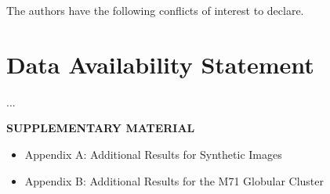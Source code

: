 \documentclass[
  12pt]{article}
\begin{document}
The authors have the following conflicts of interest to declare.



\section{Data Availability Statement}\label{data-availability-statement}

...

\label{supplementary-material}
\bigskip
\begin{center}
{\large\bf SUPPLEMENTARY MATERIAL}
\end{center}

\begin{itemize}
    \item Appendix A: Additional Results for Synthetic Images
    \item Appendix B: Additional Results for the M71 Globular Cluster
\end{itemize}






\clearpage
\end{document}
